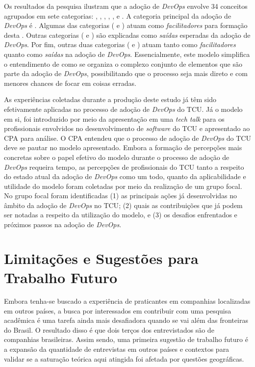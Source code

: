 Os resultados da pesquisa ilustram que a adoção de {\it DevOps} envolve 34
conceitos agrupados em sete categorias: , ,
, \cc, ,
 e . A categoria principal da adoção de
{\it DevOps} é \cc. Algumas das categorias ( e ) atuam como \emph{facilitadores} para formação desta \cc.
Outras categorias ( e ) são explicadas como
\emph{saídas} esperadas da adoção de {\it DevOps}. Por fim, outras duas
categorias ( e ) atuam tanto
como \emph{facilitadores} quanto como \emph{saídas} na adoção de {\it DevOps}.
Essencialmente, este modelo simplifica o entendimento de como se organiza o
complexo conjunto de elementos que são parte da adoção de {\it DevOps},
possibilitando que o processo seja mais direto e com menores chances de focar
em coisas erradas.

As experiências coletadas durante a produção deste estudo já têm sido
efetivamente aplicadas no processo de adoção de {\it DevOps} do \acrshort{TCU}.
Já o modelo em si, foi introduzido por meio da apresentação em uma {\it tech talk}
para os profissionais envolvidos no desenvolvimento de {\it software} do \acrshort{TCU}
e apresentado ao \acrshort{CPA} para análise. O \acrshort{CPA} entendeu que o
processo de adoção de {\it DevOps} do \acrshort{TCU} deve se pautar no modelo apresentado.
Embora a formação de percepções mais concretas sobre o papel efetivo do modelo
durante o processo de adoção de {\it DevOps} requeira tempo, as percepções de
profissionais do \acrshort{TCU} tanto a respeito do estado atual da adoção de
{\it DevOps} como um todo, quanto da aplicabilidade e utilidade do modelo foram
coletadas por meio da realização de um grupo focal. No grupo focal foram
identificadas (1) as principais ações já desenvolvidas no âmbito da adoção de
{\it DevOps} no \acrshort{TCU}; (2) quais as contribuições que já podem ser
notadas a respeito da utilização do modelo, e (3) os desafios enfrentados e
próximos passos na adoção de {\it DevOps}.

\section{Limitações e Sugestões para Trabalho Futuro}\label{limitacoes}

Embora tenha-se buscado a experiência de praticantes em companhias localizadas
em outros países, a busca por interessados em contribuir com uma pesquisa
acadêmica é uma tarefa ainda mais desafiadora quando se vai além das fronteiras
do Brasil. O resultado disso é que dois terços dos entrevistados são de
companhias brasileiras. Assim sendo, uma primeira sugestão de trabalho
futuro é a expansão da quantidade de entrevistas em outros países e contextos
para validar se a saturação teórica aqui atingida foi afetada por questões
geográficas.

